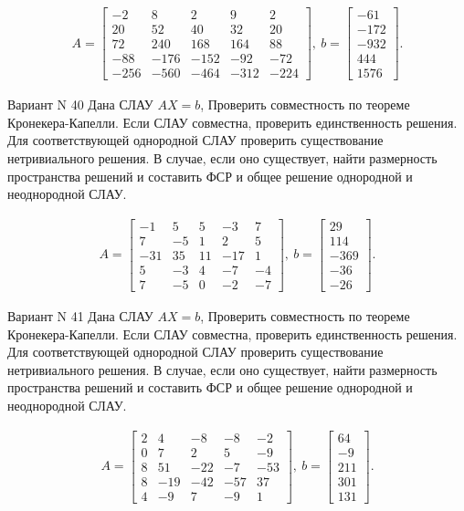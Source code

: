 \documentclass[11pt]{report}
\begin{document}
\begin{align*}
 A = \left[\begin{matrix}-2 & 8 & 2 & 9 & 2\\20 & 52 & 40 & 32 & 20\\72 & 240 & 168 & 164 & 88\\-88 & -176 & -152 & -92 & -72\\-256 & -560 & -464 & -312 & -224\end{matrix}\right],
\ b = \left[\begin{matrix}-61\\-172\\-932\\444\\1576\end{matrix}\right]. 
 \end{align*}

Вариант N 40
Дана СЛАУ $AX = b$,
Проверить совместность по теореме Кронекера-Капелли. Если СЛАУ совместна, проверить единственность решения.
Для соответствующей однородной СЛАУ проверить существование нетривиального решения. В случае, если оно существует,
найти размерность пространства решений и составить ФСР и общее решение однородной  и неоднородной СЛАУ.


\begin{align*}
 A = \left[\begin{matrix}-1 & 5 & 5 & -3 & 7\\7 & -5 & 1 & 2 & 5\\-31 & 35 & 11 & -17 & 1\\5 & -3 & 4 & -7 & -4\\7 & -5 & 0 & -2 & -7\end{matrix}\right],
\ b = \left[\begin{matrix}29\\114\\-369\\-36\\-26\end{matrix}\right]. 
 \end{align*}

Вариант N 41
Дана СЛАУ $AX = b$,
Проверить совместность по теореме Кронекера-Капелли. Если СЛАУ совместна, проверить единственность решения.
Для соответствующей однородной СЛАУ проверить существование нетривиального решения. В случае, если оно существует,
найти размерность пространства решений и составить ФСР и общее решение однородной  и неоднородной СЛАУ.


\begin{align*}
 A = \left[\begin{matrix}2 & 4 & -8 & -8 & -2\\0 & 7 & 2 & 5 & -9\\8 & 51 & -22 & -7 & -53\\8 & -19 & -42 & -57 & 37\\4 & -9 & 7 & -9 & 1\end{matrix}\right],
\ b = \left[\begin{matrix}64\\-9\\211\\301\\131\end{matrix}\right]. 
 \end{align*}
\end{document}
